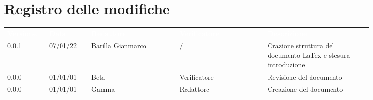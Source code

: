 \section*{Registro delle modifiche}

{\renewcommand{\arraystretch}{1.5}
\begin{tabular}{p{0.10\linewidth}p{0.10\linewidth}p{0.21\linewidth}p{0.21\linewidth}p{0.25\linewidth}}
	\rowcolor[RGB]{33, 73, 50}
	\textcolor{white}{\textbf{Versione}} & \textcolor{white}{\textbf{Data}} & \textcolor{white}
	{\textbf{Redattore}} & \textcolor{white}{\textbf{Verificatore}} & \textcolor{white}
	{\textbf{Descrizione}}\\
	\rowcolor[RGB]{216, 235, 171}
	0.0.1 & 07/01/22 & Barilla Gianmarco & / & Crazione struttura del documento LaTex e stesura introduzione\\
	\rowcolor[RGB]{233, 245, 206}
	0.0.0 & 01/01/01 & Beta & Verificatore & Revisione del documento\\
	\rowcolor[RGB]{216, 235, 171}
	0.0.0 & 01/01/01 & Gamma & Redattore & Creazione del documento\\
	
\end{tabular}	
}